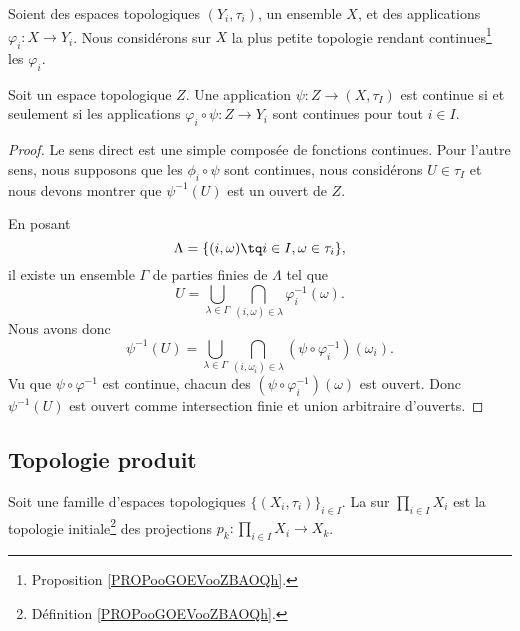 \begin{proposition}		\label{PROPooCBPEooCuaLUk}
	Soient des espaces topologiques \( (Y_i,\tau_i)\), un ensemble \( X\), et des applications \( \varphi_i\colon X\to Y_i\). Nous considérons sur \( X\) la plus petite topologie rendant continues\footnote{Proposition \ref{PROPooGOEVooZBAOQh}.} les \( \varphi_i\).

	Soit un espace topologique \( Z\). Une application \( \psi\colon Z\to (X,\tau_I)\) est continue si et seulement si les applications \( \varphi_i\circ\psi\colon Z\to Y_i\) sont continues pour tout \( i\in I\).
\end{proposition}

\begin{proof}
	Le sens direct est une simple composée de fonctions continues. Pour l'autre sens, nous supposons que les \( \phi_i\circ\psi\) sont continues, nous considérons \( U\in \tau_I\) et nous devons montrer que \( \psi^{-1}(U)\) est un ouvert de \( Z\).

	En posant
	\begin{equation}
		\Lambda=\{ (i,\omega)\tq i\in I,\omega\in \tau_i \},
	\end{equation}
	il existe un ensemble \( \Gamma\) de parties finies de \( \Lambda\) tel que
	\begin{equation}
		U= \bigcup_{\lambda\in \Gamma}  \bigcap_{(i,\omega)\in\lambda}\varphi_i^{-1}(\omega).
	\end{equation}
	Nous avons donc
	\begin{equation}
		\psi^{-1}(U)=\bigcup_{\lambda\in \Gamma}\bigcap_{(i,\omega_i)\in\lambda}(\psi\circ\varphi_i^{-1})(\omega_i).
	\end{equation}
	Vu que \( \psi\circ\varphi^{-1}\) est continue, chacun des \( (\psi\circ\varphi_i^{-1})(\omega)\) est ouvert. Donc \( \psi^{-1}(U)\) est ouvert comme intersection finie et union arbitraire d'ouverts.
\end{proof}



\subsection{Topologie produit}


\begin{definition}	\label{DEFooJHXKooQApPtQ}
	Soit une famille d'espaces topologiques \( \{ (X_i,\tau_i) \}_{i\in I}\). La  sur \( \prod_{i\in I}X_i\) est la topologie initiale\footnote{Définition \ref{PROPooGOEVooZBAOQh}.} des projections \(p_k \colon \prod_{i\in I}X_i\to X_k  \).
\end{definition}


